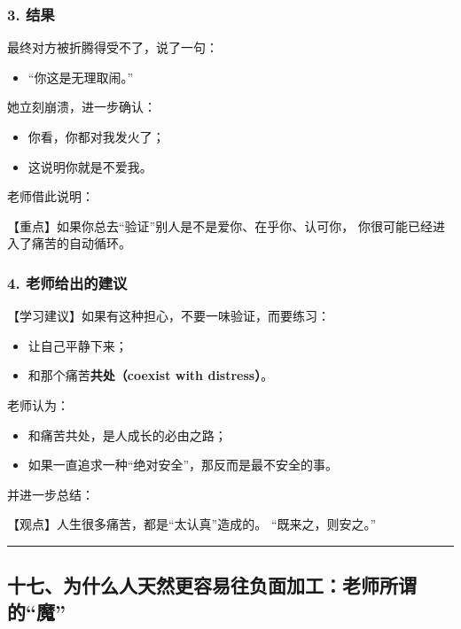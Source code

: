 \documentclass[
  chinese,
  9pt,
  a4paper,
]{ctexart}
\providecommand{\tightlist}{%
  \setlength{\itemsep}{0pt}\setlength{\parskip}{0pt}}
\begin{document}
\subsubsection{3. 结果}\label{ux7ed3ux679c-1}

最终对方被折腾得受不了，说了一句：

\begin{itemize}
\tightlist
\item
  ``你这是无理取闹。''
\end{itemize}

她立刻崩溃，进一步确认：

\begin{itemize}
\tightlist
\item
  你看，你都对我发火了；
\item
  这说明你就是不爱我。
\end{itemize}

老师借此说明：

【重点】如果你总去``验证''别人是不是爱你、在乎你、认可你，
你很可能已经进入了痛苦的自动循环。

\subsubsection{4.
老师给出的建议}\label{ux8001ux5e08ux7ed9ux51faux7684ux5efaux8bae}

【学习建议】如果有这种担心，不要一味验证，而要练习：

\begin{itemize}
\tightlist
\item
  让自己平静下来；
\item
  和那个痛苦\textbf{共处（coexist with distress）}。
\end{itemize}

老师认为：

\begin{itemize}
\tightlist
\item
  和痛苦共处，是人成长的必由之路；
\item
  如果一直追求一种``绝对安全''，那反而是最不安全的事。
\end{itemize}

并进一步总结：

【观点】人生很多痛苦，都是``太认真''造成的。 ``既来之，则安之。''

\begin{center}\rule{0.5\linewidth}{0.5pt}\end{center}

\subsection{十七、为什么人天然更容易往负面加工：老师所谓的``魔''}\label{ux5341ux4e03ux4e3aux4ec0ux4e48ux4ebaux5929ux7136ux66f4ux5bb9ux6613ux5f80ux8d1fux9762ux52a0ux5de5ux8001ux5e08ux6240ux8c13ux7684ux9b54}
\end{document}
